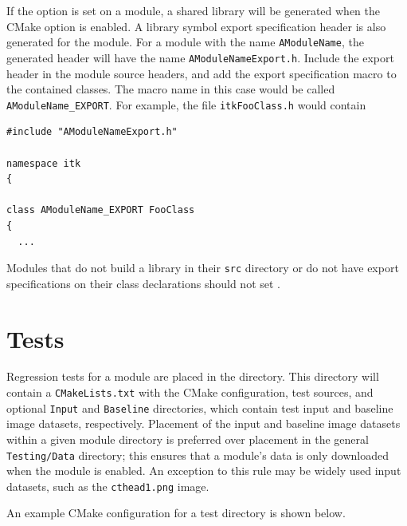 If the  option is set on a
module, a shared library will be generated when
the CMake option  is enabled.  A library symbol
export specification header is also generated for the module.  For a module
with the name \texttt{AModuleName}, the generated header will have the name
\texttt{AModuleNameExport.h}. Include the export header in the module source
headers, and add the export specification macro to the contained classes.  The
macro name in this case would be called \texttt{AModuleName\_EXPORT}. For
example, the file \texttt{itkFooClass.h} would contain

\begin{verbatim}
#include "AModuleNameExport.h"

namespace itk
{

class AModuleName_EXPORT FooClass
{
  ...
\end{verbatim}

Modules that do not build a library in their \texttt{src} directory or do not
have export specifications on their class declarations should not set
.


\section{Tests}%
\label{sec:Tests}%

Regression tests for a module are placed in the  directory. This
directory will contain a \texttt{CMakeLists.txt} with the CMake configuration,
test sources, and optional \texttt{Input} and \texttt{Baseline} directories,
which contain test input and baseline image datasets, respectively. Placement
of the input and baseline image datasets within a given module directory is
preferred over placement in the general \texttt{Testing/Data} directory; this
ensures that a module's data is only downloaded when the module is enabled. An
exception to this rule may be widely used input datasets, such as the
\texttt{cthead1.png} image.

An example CMake configuration for a test directory is shown below.

